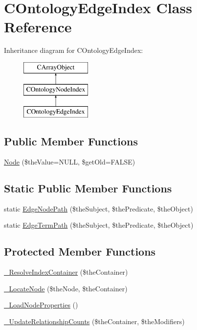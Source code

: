 \hypertarget{class_c_ontology_edge_index}{\section{C\-Ontology\-Edge\-Index Class Reference}
\label{class_c_ontology_edge_index}
}
Inheritance diagram for C\-Ontology\-Edge\-Index\-:\begin{figure}[H]
\begin{center}
\leavevmode
\includegraphics[height=3.000000cm]{class_c_ontology_edge_index}
\end{center}
\end{figure}
\subsection*{Public Member Functions}
\begin{DoxyCompactItemize}
\item 
\hyperlink{class_c_ontology_edge_index_aef9939a536194ce9b30e10482680eca1}{Node} (\$the\-Value=N\-U\-L\-L, \$get\-Old=F\-A\-L\-S\-E)
\end{DoxyCompactItemize}
\subsection*{Static Public Member Functions}
\begin{DoxyCompactItemize}
\item 
static \hyperlink{class_c_ontology_edge_index_a1f80775f4c10d2874ee8cc3b305fbf9c}{Edge\-Node\-Path} (\$the\-Subject, \$the\-Predicate, \$the\-Object)
\item 
static \hyperlink{class_c_ontology_edge_index_a4651e5286d115b9d7199f4495e9364c8}{Edge\-Term\-Path} (\$the\-Subject, \$the\-Predicate, \$the\-Object)
\end{DoxyCompactItemize}
\subsection*{Protected Member Functions}
\begin{DoxyCompactItemize}
\item 
\hyperlink{class_c_ontology_edge_index_aa4f3adfe8b756a431e3d340cc520b280}{\-\_\-\-Resolve\-Index\-Container} (\$the\-Container)
\item 
\hyperlink{class_c_ontology_edge_index_ab0c531b87f7fc299c5049a799c8d08f6}{\-\_\-\-Locate\-Node} (\$the\-Node, \$the\-Container)
\item 
\hyperlink{class_c_ontology_edge_index_a2372b1263035d74288b776dbc5216e44}{\-\_\-\-Load\-Node\-Properties} ()
\item 
\hyperlink{class_c_ontology_edge_index_acde4d1d07af376b3ac764018dab8622c}{\-\_\-\-Update\-Relationship\-Counts} (\$the\-Container, \$the\-Modifiers)
\end{DoxyCompactItemize}
